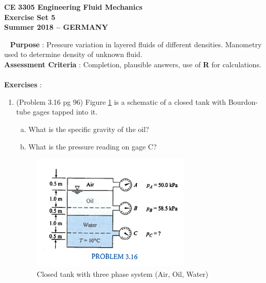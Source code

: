 \documentclass[12pt]{article}
\begin{document}
\begingroup
\begin{center}
{\textbf{{ CE 3305 Engineering Fluid Mechanics} \\ Exercise Set 5 \\ Summer 2018 -- GERMANY} }
\end{center}
\endgroup
\begingroup
~\newline
\textbf{Purpose} : Pressure variation in layered fluids of different densities.  Manometry used to determine density of unknown fluid.\\
\textbf{Assessment Criteria} : Completion, plausible answers, use of \textbf{R} for calculations. \\~\\
\textbf{Exercises} :

\begin{enumerate}
\item (Problem 3.16 pg 96)
Figure \ref{fig:AirOilWaterTank} is a schematic of a closed tank with Bourdon-tube gages tapped into it.   
\begin{enumerate}[a)]
\item What is the specific gravity of the oil?
\item What is the pressure reading on gage C?
\end{enumerate}
\begin{figure}[htbp] %
   \centering
   \includegraphics[width=3in]{AirOilWaterTank.jpg} 
   \caption{Closed tank with three phase system (Air, Oil, Water)}
   \label{fig:AirOilWaterTank}
\end{figure}
\clearpage


\end{enumerate}
\end{document}
